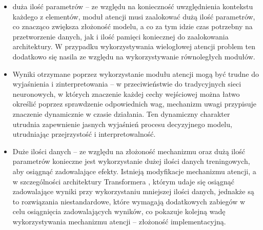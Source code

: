 \begin{itemize}
  \item duża ilość parametrów -- ze względu na konieczność uwzględnienia kontekstu każdego z elementów, moduł atencji musi zaalokować dużą ilość parametrów, co znacząco zwiększa złożoność modelu, a co za tym idzie czas potrzebny na przetworzenie danych, jak i ilość pamięci koniecznej do zaalokowania architektury. W przypadku wykorzystywania wielogłowej atencji problem ten dodatkowo się nasila ze względu na wykorzystywanie równoległych modułów.
  \item Wyniki otrzymane poprzez wykorzystanie modułu atencji mogą być trudne do wyjaśnienia i zinterpretowania -- w przeciwieństwie do tradycyjnych sieci neuronowych, w których znaczenie każdej cechy wejściowej można łatwo określić poprzez sprawdzenie odpowiednich wag, mechanizm uwagi przypisuje znaczenie dynamicznie w czasie działania. Ten dynamiczny charakter utrudnia zapewnienie jasnych wyjaśnień procesu decyzyjnego modelu, utrudniając przejrzystość i interpretowalność.
  \item Duże ilości danych -- ze względu na złożoność mechanizmu oraz dużą ilość parametrów konieczne jest wykorzystanie dużej ilości danych treningowych, aby osiągnąć zadowalające efekty. Istnieją modyfikacje mechanizmu atencji, a w szczególności architektury Transformera \cite{xu2021optimizing}, którym udaje się osiągnąć zadowalające wyniki przy wykorzystaniu mniejszej ilości danych, jednakże są to rozwiązania niestandardowe, które wymagają dodatkowych zabiegów w celu osiągnięcia zadowalających wyników, co pokazuje kolejną wadę wykorzystywania mechanizmu atencji -- złożoność implementacyjną.
\end{itemize}

